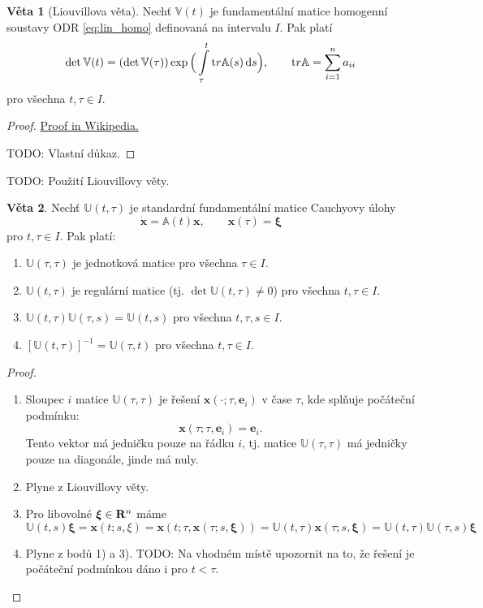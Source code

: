 \documentclass[a4paper, 12pt]{book}
\theoremstyle{definition}
\newtheorem{theorem}{Věta}[section]
\def\Real{{\rm\bf R}}
\def\d{\,{\rm d}}               %
\def\vc#1{\mathbf{\boldsymbol{#1}}}     %
\def\tn#1{{\mathbb{#1}}}    %
\def\todo#1{{\color{green}TODO:} #1}
\begin{document}
\begin{theorem}[Liouvillova věta]
     Nechť $\tn V(t)$ je fundamentální matice homogenní soustavy ODR \eqref{eq:lin_homo} definovaná na intervalu $I$.
     Pak platí
     \[
        \det{\tn V}(t) = (\det{\tn V}(\tau)) \exp \Big( \int\limits_\tau^t {\mathrm tr} \tn A(s) \d s \Big), \qquad {\mathrm tr} \tn A = \sum\limits_{i=1}^n a_{ii}
     \]
     pro všechna $t, \tau\in I$.
\end{theorem}
\begin{proof}
  \href{http://en.wikipedia.org/wiki/Liouville%27s_formula}{Proof in Wikipedia.}

  \todo{Vlastní důkaz.}
\end{proof}
\todo{Použití Liouvillovy věty.}

 
\begin{theorem}
Nechť ${\tn U}(t,\tau)$ je standardní fundamentální matice Cauchyovy úlohy
\[
    \dot{\vc x} = {\tn A}(t)\vc x,\qquad \vc x(\tau)=\vc\xi
\]
pro $t, \tau\in I$. Pak platí:
\begin{enumerate}
\item ${\tn U}(\tau,\tau)$ je jednotková matice pro všechna $\tau\in I$.
\item ${\tn U}(t,\tau)$ je regulární matice (tj. $\det{\tn U}(t,\tau)\neq 0$) pro všechna $t, \tau\in I$.
\item ${\tn U}(t,\tau){\tn U}(\tau,s)={\tn U}(t,s)$ pro všechna $t, \tau, s\in I$.
\item $[{\tn U}(t,\tau)]^{-1}={\tn U}(\tau,t)$ pro všechna $t, \tau\in I$.
\end{enumerate}
\end{theorem}
\begin{proof}
\noindent
\begin{enumerate}
 \item Sloupec $i$ matice $\tn U(\tau, \tau)$ je řešení  $\vc x( \cdot; \tau, \vc e_i)$ v čase $\tau$, kde splňuje počáteční podmínku:
 \[
    \vc x(\tau; \tau, \vc e_i) = \vc e_i.
 \]
 Tento vektor má jedničku pouze na řádku $i$, tj. matice $\tn U(\tau, \tau)$ má jedničky pouze na diagonále, jinde má nuly.
 
 \item Plyne z Liouvillovy věty. 
 
 \item Pro libovolné $\vc \xi \in \Real^n$ máme
 \[
    \tn U(t,s) \vc \xi =
    \vc x(t;s, \xi) = \vc x(t; \tau, \vc x(\tau; s, \vc \xi)) =
    \tn U(t,\tau) \vc x(\tau; s, \vc \xi) =
    \tn U(t, \tau) \tn U(\tau, s) \vc \xi    
 \]

 \item Plyne z bodů 1) a 3). \todo{Na vhodném místě upozornit na to, že řešení je počáteční podmínkou dáno i pro $t < \tau$.}
\end{enumerate}
\end{proof}
\end{document}
